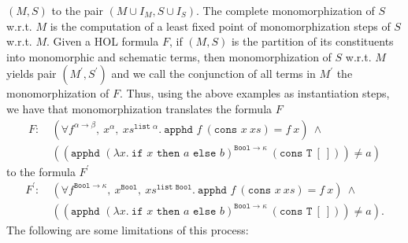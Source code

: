 \documentclass[11pt]{article}
\begin{document}
	$(M,S)$ to the pair 
	$(M \cup I_M, S \cup I_S)$. The 
	complete monomorphization of 
	$S$ w.r.t. $M$ is the computation of 
	a least fixed point of monomorphization 
	steps of $S$ w.r.t. $M$. Given a HOL 
	formula $F$, if $(M, S)$ is the partition 
	of its constituents into monomorphic and 
	schematic terms, then monomorphization 
	of $S$ w.r.t. $M$ yields pair 
	$(M^{\prime}, S^{\prime})$ and we 
	call the conjunction of all terms in 
	$M^{\prime}$ the monomorphization 
	of $F$.
	Thus, using the above examples as 
	instantiation steps, we have that 
	monomorphization translates the formula $F$
	\begin{align*}
	F:\ &(\forall f^{\alpha \to \beta},\ 
	x^{\alpha},\ xs^{\texttt{list }\alpha}.\ 
	\texttt{apphd }f\ (\texttt{cons }x
	\ xs) = f\ x)\ \land\ \\
	&((\texttt{apphd }(\lambda x.\ 
	\texttt{if }x \texttt{ then }a 
	\texttt{ else } b)^{\texttt{Bool} 
		\to \kappa}\ (\texttt{cons T}\ [\ ])) 
	\neq a)
	\end{align*}
	to the formula $F^{\prime}$
	\begin{align*}
	F^{\prime}:\ &(\forall 
	f^{\texttt{Bool} \to \kappa},\ 
	x^{\texttt{Bool}},\ 
	xs^{\texttt{list Bool}}.\ 
	\texttt{apphd }f\ (\texttt{cons }x
	\ xs) = f\ x) \ \land\ \\
	&((\texttt{apphd } (\lambda x.\ 
	\texttt{if }x \texttt{ then }a 
	\texttt{ else } b)^{\texttt{Bool} 
		\to \kappa}\ (\texttt{cons T}\ 
	[\ ])) \neq a).
	\end{align*}
	\noindent The following are some 
	limitations of this process:
\end{document}
